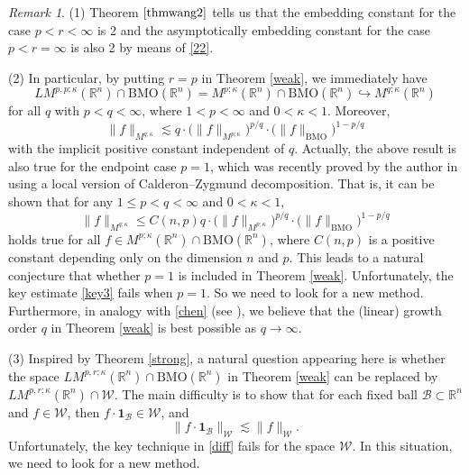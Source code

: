 \documentclass{birkjour}
\theoremstyle{definition}
\theoremstyle{remark}
\newtheorem{rem}[thm]{Remark}
\numberwithin{equation}{section}
\begin{document}
\begin{rem}\label{citeremark3}
(1) Theorem $\ref{thmwang2}$ tells us that the embedding constant for the case $p<r<\infty$ is 2 and the asymptotically embedding constant for the case $p<r=\infty$ is also 2 by means of \eqref{22}.

(2) In particular, by putting $r=p$ in Theorem \ref{weak}, we immediately have
\begin{equation*}
LM^{p,p;\kappa}(\mathbb R^n)\cap \mathrm{BMO}(\mathbb R^n)
=M^{p;\kappa}(\mathbb R^n)\cap \mathrm{BMO}(\mathbb R^n)\hookrightarrow  M^{q;\kappa}(\mathbb R^n)
\end{equation*}
for all $q$ with $p<q<\infty$, where $1<p<\infty$ and $0<\kappa<1$. Moreover,
\begin{equation*}
\|f\|_{M^{q;\kappa}}\lesssim q\cdot\big(\|f\|_{M^{p;\kappa}}\big)^{p/q}\cdot\big(\|f\|_{\mathrm{BMO}}\big)^{1-p/q}
\end{equation*}
with the implicit positive constant independent of $q$. Actually, the above result is also true for the endpoint case $p=1$, which was recently proved by the author in \cite{wang} using a local version of Calderon--Zygmund decomposition. That is, it can be shown that for any $1\leq p<q<\infty$ and $0<\kappa<1$,
\begin{equation}\label{chenwang}
\|f\|_{M^{q;\kappa}}\leq C(n,p)q\cdot\big(\|f\|_{M^{p;\kappa}}\big)^{p/q}\cdot\big(\|f\|_{\mathrm{BMO}}\big)^{1-p/q}
\end{equation}
holds true for all $f\in M^{p;\kappa}(\mathbb R^n)\cap \mathrm{BMO}(\mathbb R^n)$, where $C(n,p)$ is a positive constant depending only on the dimension $n$ and $p$. This leads to a natural conjecture that whether $p=1$ is included in Theorem \ref{weak}. Unfortunately, the key estimate \eqref{key3} fails when $p=1$. So we need to look for a new method. Furthermore, in analogy with \eqref{chen}
(see \cite[Theorem 2.2 and Remark (iii)]{Kozono2}), we believe that the (linear) growth order $q$ in Theorem \ref{weak} is best possible as $q\to\infty$.

(3) Inspired by Theorem \ref{strong}, a natural question appearing here is whether the space $LM^{p,r;\kappa}(\mathbb R^n)\cap \mathrm{BMO}(\mathbb R^n)$ in Theorem \ref{weak} can be replaced by $LM^{p,r;\kappa}(\mathbb R^n)\cap \mathcal{W}$. The main difficulty is to show that for each fixed ball $\mathcal{B}\subset\mathbb R^n$ and $f\in \mathcal{W}$, then $f\cdot\mathbf{1}_{\mathcal{B}}\in \mathcal{W}$, and
\begin{equation*}
\|f\cdot\mathbf{1}_{\mathcal{B}}\|_{\mathcal{W}}\lesssim \|f\|_{\mathcal{W}}.
\end{equation*}
Unfortunately, the key technique in \eqref{diff} fails for the space $\mathcal{W}$. In this situation, we need to look for a new method.
\end{rem}
\end{document}
